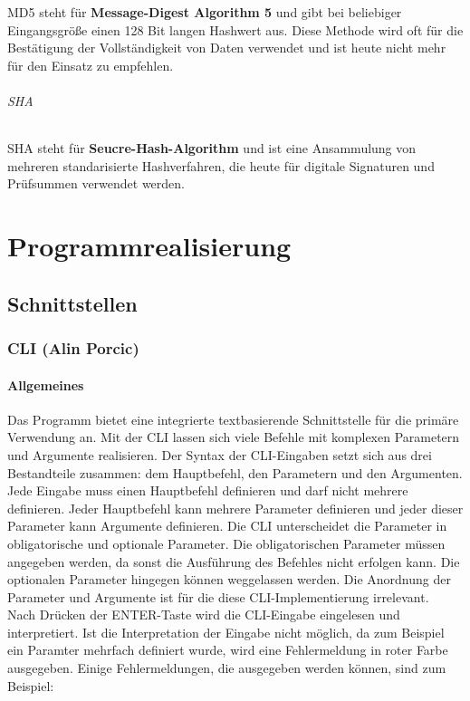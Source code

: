 \documentclass[12pt,a4paper]{report}
\begin{document}
\begin{onehalfspace}
MD5 steht für \textbf{Message-Digest Algorithm 5} und gibt bei beliebiger Eingangsgröße einen 128 Bit langen Hashwert aus. Diese Methode wird oft für die Bestätigung der Vollständigkeit von Daten verwendet und ist heute nicht mehr für den Einsatz zu empfehlen.

\paragraph{SHA}

SHA steht für \textbf{Seucre-Hash-Algorithm} und ist eine Ansammulung von mehreren standarisierte Hashverfahren, die heute für digitale Signaturen und Prüfsummen verwendet werden.

\part{Programmrealisierung}

\chapter{Schnittstellen}

\section{CLI (Alin Porcic)}

\subsection{Allgemeines}

Das Programm bietet eine integrierte textbasierende Schnittstelle für die primäre Verwendung an. Mit der CLI lassen sich viele Befehle mit komplexen Parametern und Argumente realisieren. Der Syntax der CLI-Eingaben setzt sich aus drei Bestandteile zusammen: dem Hauptbefehl, den Parametern und den Argumenten. Jede Eingabe muss einen Hauptbefehl definieren und darf nicht mehrere definieren. Jeder Hauptbefehl kann mehrere Parameter definieren und jeder dieser Parameter kann Argumente definieren. Die CLI unterscheidet die Parameter in obligatorische und optionale Parameter. Die obligatorischen Parameter müssen angegeben werden, da sonst die Ausführung des Befehles nicht erfolgen kann. Die optionalen Parameter hingegen können weggelassen werden. Die Anordnung der Parameter und Argumente ist für die diese CLI-Implementierung irrelevant.\\
Nach Drücken der ENTER-Taste wird die CLI-Eingabe eingelesen und interpretiert. Ist die Interpretation der Eingabe nicht möglich, da zum Beispiel ein Paramter mehrfach definiert wurde, wird eine Fehlermeldung in roter Farbe ausgegeben. Einige Fehlermeldungen, die ausgegeben werden können, sind zum Beispiel:


\end{onehalfspace}
\end{document}
